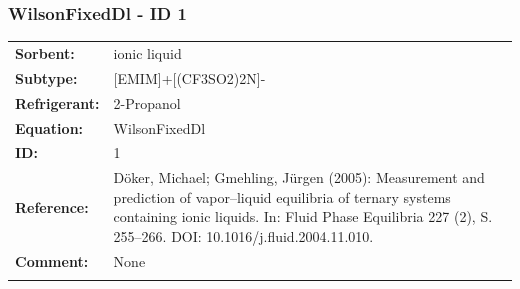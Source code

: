 \subsubsection{WilsonFixedDl - ID 1}
%
\begin{tabular}[l]{|lp{11.5cm}|}
\hline
\addlinespace

\textbf{Sorbent:} & ionic liquid \\
\textbf{Subtype:} & [EMIM]+[(CF3SO2)2N]- \\
\textbf{Refrigerant:} & 2-Propanol \\
\textbf{Equation:} & WilsonFixedDl \\
\textbf{ID:} & 1 \\
\textbf{Reference:} & Döker, Michael; Gmehling, Jürgen (2005): Measurement and prediction of vapor–liquid equilibria of ternary systems containing ionic liquids. In: Fluid Phase Equilibria 227 (2), S. 255–266. DOI: 10.1016/j.fluid.2004.11.010. \\
\textbf{Comment:} & None \\

\addlinespace
\hline
\end{tabular}
\newline

